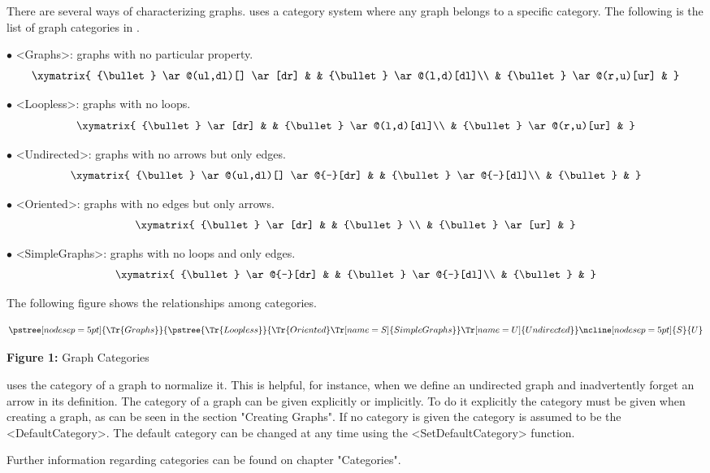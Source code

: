 There are several ways of characterizing graphs. {\YAGS} uses a category
system where any graph belongs to a specific category. The following
is the list of graph categories in {\YAGS}.

\beginlist
\item{$\bullet$} <Graphs>: graphs with no particular property.
$$
\xymatrix{
   {\bullet} \ar@(ul,dl)[] \ar[dr] & & {\bullet} \ar@(l,d)[dl]\\
   & {\bullet} \ar@(r,u)[ur] & 
} 
$$
\item{$\bullet$} <Loopless>: graphs with no loops.
$$
\xymatrix{
   {\bullet} \ar[dr] & & {\bullet} \ar@(l,d)[dl]\\
   & {\bullet} \ar@(r,u)[ur] & 
} 
$$
\item{$\bullet$} <Undirected>: graphs with no arrows but only edges.
$$
\xymatrix{
   {\bullet} \ar@(ul,dl)[] \ar@{-}[dr] & & {\bullet} \ar@{-}[dl]\\
   & {\bullet} & 
} 
$$
\item{$\bullet$} <Oriented>: graphs with no edges but only arrows.
$$
\xymatrix{
   {\bullet} \ar[dr] & & {\bullet} \\
   & {\bullet} \ar[ur] & 
} 
$$
\item{$\bullet$} <SimpleGraphs>: graphs with no loops and only edges.
\endlist
$$
\xymatrix{
   {\bullet} \ar@{-}[dr] & & {\bullet} \ar@{-}[dl]\\
   & {\bullet} & 
} 
$$

The following figure shows the relationships among categories.

$$
\pstree[nodesep=5pt]{\Tr{Graphs}}
{
  \pstree{\Tr{Loopless}}
  {
         \Tr{Oriented}
         \Tr[name=S]{Simple Graphs}
  }
  \Tr[name=U]{Undirected}
}
\ncline[nodesep=5pt]{S}{U}
$$
\medskip\nobreak
\centerline{{\bf Figure 1:} Graph Categories}
\medskip

{\YAGS} uses the category of a graph to normalize it. This is helpful,
for instance, when we define an undirected graph and inadvertently
forget an arrow in its definition. The category of a graph can be
given explicitly or implicitly. To do it explicitly the category must
be given when creating a graph, as can be seen in the section
"Creating Graphs". If no category is given the category is assumed to
be the <DefaultCategory>. The default category can be changed at any
time using the <SetDefaultCategory> function.

Further information regarding categories can be found on chapter "Categories".


